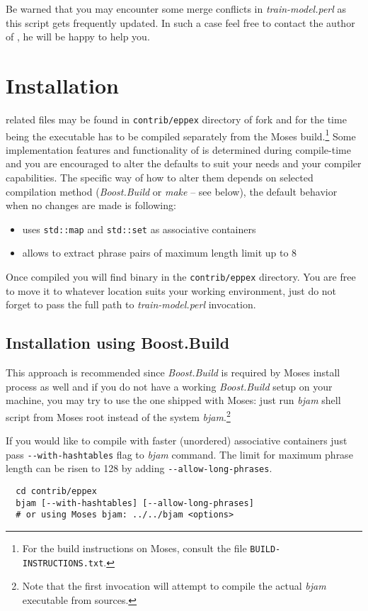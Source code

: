 Be warned that you may encounter some merge conflicts in \emph{train-model.perl}
as this script gets frequently updated.
In such a case feel free to contact the author of \eppex{},
he will be happy to help you.

\section{Installation}

\Eppex{} related files may be found in \texttt{contrib/eppex} directory of \eppex{} fork
and for the time being the executable has to be compiled separately from the Moses
build.\footnote{For the build instructions on Moses, consult the file \texttt{BUILD-INSTRUCTIONS.txt}.}
Some implementation features and functionality of \eppex{} is determined during compile-time
and you are encouraged to alter the defaults to suit your needs and your compiler capabilities.
The specific way of how to alter them depends on selected compilation method (\emph{Boost.Build} or
\emph{make} -- see below), the default behavior when no changes are made is following:
\begin{itemize}
  \item \eppex{} uses \verb|std::map| and \verb|std::set| as associative containers
  \item \eppex{} allows to extract phrase pairs of maximum length limit up to 8
\end{itemize}

Once compiled you will find \eppex{} binary in the \texttt{contrib/eppex} directory.
You are free to move it to whatever location suits your working environment,
just do not forget to pass the full path to \emph{train-model.perl} invocation.

\subsection*{Installation using Boost.Build}

This approach is recommended since \emph{Boost.Build}
is required by Moses install process as well and if you do not have a working
\emph{Boost.Build} setup on your machine, you may try to use the one shipped with Moses:
just run \emph{bjam} shell script from Moses root instead of the system \emph{bjam}.\footnote{Note
that the first invocation will attempt to compile the actual \emph{bjam} executable from sources.}

If you would like to compile \eppex{} with faster (unordered) associative containers
just pass \verb|--with-hashtables| flag to \emph{bjam} command.
The limit for maximum phrase length can be risen to 128 by adding
\verb|--allow-long-phrases|.
\begin{verbatim}
  cd contrib/eppex
  bjam [--with-hashtables] [--allow-long-phrases]
  # or using Moses bjam: ../../bjam <options>
\end{verbatim}

